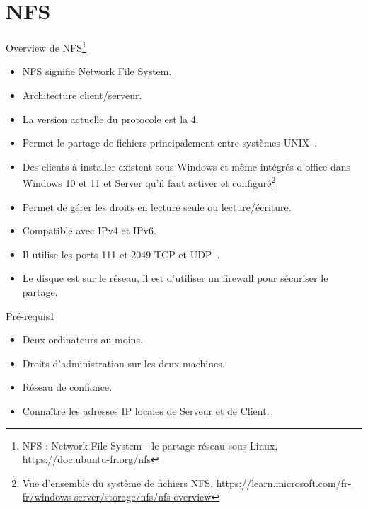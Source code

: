 \documentclass{beamer}
\begin{document}
    \section{NFS}\label{sec:nfs}

    \begin{frame}{Overview de NFS\footnote{\label{nfs}NFS : Network File System - le partage réseau sous Linux, \url{https://doc.ubuntu-fr.org/nfs}}}
        \begin{itemize}
            \item NFS signifie Network File System.
            \item Architecture client/serveur.
            \item La version actuelle du protocole est la 4.
            \item Permet le partage de fichiers principalement entre systèmes UNIX~.
            \item Des clients à installer existent sous Windows et même intégrés d'office dans Windows 10 et 11 et Server qu'il faut activer et configuré\footnote{Vue d’ensemble du système de fichiers NFS, \url{https://learn.microsoft.com/fr-fr/windows-server/storage/nfs/nfs-overview}}.
            \item Permet de gérer les droits en lecture seule ou lecture/écriture.
            \item Compatible avec IPv4 et IPv6.
            \item Il utilise les ports 111 et 2049 TCP et UDP~.
            \item Le disque est sur le réseau, il est d'utiliser un firewall pour sécuriser le partage.
        \end{itemize}
    \end{frame}

    \begin{frame}{Pré-requis\cref{nfs}}
        \begin{itemize}
            \item Deux ordinateurs au moins.
            \item Droits d'administration sur les deux machines.
            \item Réseau de confiance.
            \item Connaître les adresses IP locales de Serveur et de Client.
        \end{itemize}
    \end{frame}
\end{document}

